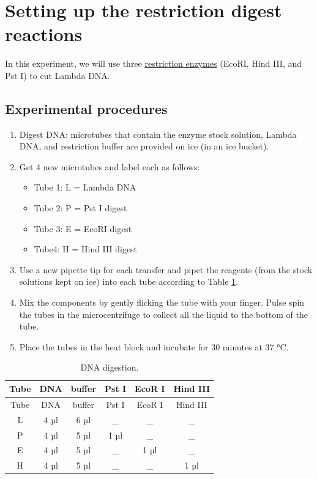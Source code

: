 \section{Setting up the restriction digest
reactions}\label{setting-up-the-restriction-digest-reactions}

In this experiment, we will use three
\href{https://en.wikipedia.org/wiki/Restriction_enzyme}{restriction
enzymes} (EcoRI, Hind III, and Pst I) to cut Lambda DNA.

\subsection{Experimental procedures}\label{experimental-procedures-30}

\begin{enumerate}
\def\labelenumi{\arabic{enumi}.}
\tightlist
\item
  Digest DNA: microtubes that contain the enzyme stock solution, Lambda
  DNA, and restriction buffer are provided on ice (in an ice bucket).
\item
  Get 4 new microtubes and label each as follows:

  \begin{itemize}
  \tightlist
  \item
    Tube 1: L = Lambda DNA
  \item
    Tube 2: P = Pst I digest
  \item
    Tube 3: E = EcoRI digest
  \item
    Tube4: H = Hind III digest
  \end{itemize}
\item
  Use a new pipette tip for each transfer and pipet the reagents (from
  the stock solutions kept on ice) into each tube according to Table
  \ref{tab:digest}.
\item
  Mix the components by gently flicking the tube with your finger. Pulse
  spin the tubes in the microcentrifuge to collect all the liquid to the
  bottom of the tube.
\item
  Place the tubes in the heat block and incubate for 30 minutes at 37 °C.
\end{enumerate}

\begin{longtable}[]{@{}cccccc@{}}
\caption{\label{tab:digest} DNA digestion.}\tabularnewline
\toprule
Tube & DNA & buffer & Pst I & EcoR I & Hind III\tabularnewline
\midrule
\endfirsthead
\toprule
Tube & DNA & buffer & Pst I & EcoR I & Hind III\tabularnewline
\midrule
\endhead
L & 4 µl & 6 µl & \_ & \_ & \_\tabularnewline
P & 4 µl & 5 µl & 1 µl & \_ & \_\tabularnewline
E & 4 µl & 5 µl & \_ & 1 µl & \_\tabularnewline
H & 4 µl & 5 µl & \_ & \_ & 1 µl\tabularnewline
\bottomrule
\end{longtable}

